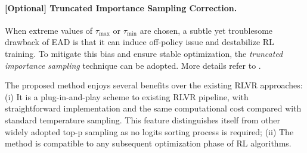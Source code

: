 \documentclass{article} %
\begin{document}
\paragraph{[Optional] Truncated Importance Sampling Correction.} 
When extreme values of $\tau_{\mathrm{max}}$ or $\tau_{\mathrm{min}}$ are chosen, a subtle yet troublesome drawback of EAD is that it can induce off-policy issue and destabilize RL training. To mitigate this bias and ensure stable optimization, the \emph{truncated importance sampling} technique\citep{heckman1998matching, hilton2022batch,yao2025offpolicy} can be adopted. More details refer to .



The proposed method enjoys several benefits over the existing RLVR approaches:
(i) It is a plug-in-and-play scheme to existing RLVR pipeline, with straightforward implementation and the same computational cost compared with standard temperature sampling. This feature distinguishes itself from other widely adopted top-p sampling \citep{Holtzman2020The} as no logits sorting process is required; (ii) The method is compatible to any subsequent optimization phase of RL algorithms. 


\end{document}
